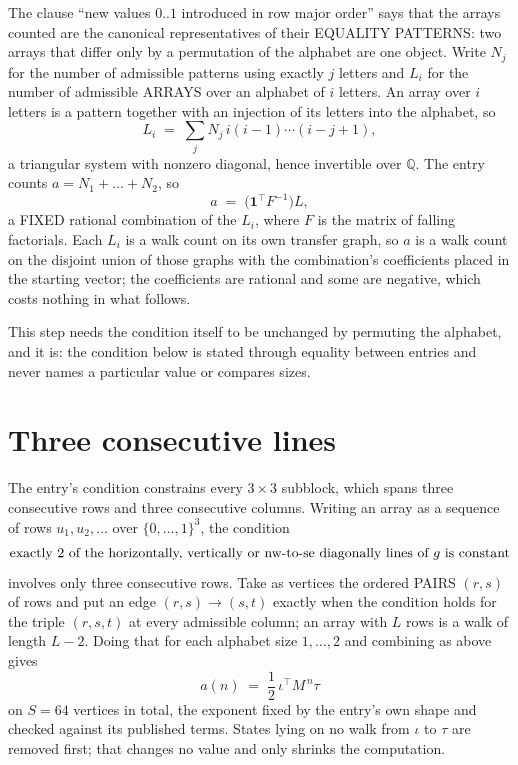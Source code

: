 \documentclass[11pt,a4paper]{article}
\theoremstyle{plain}
\theoremstyle{definition}
\begin{document}
The clause ``new values $0..1$ introduced in row major order'' says that the arrays
counted are the canonical representatives of their EQUALITY PATTERNS: two arrays that differ
only by a permutation of the alphabet are one object. Write $N_j$ for the number of admissible
patterns using exactly $j$ letters and $L_i$ for the number of admissible ARRAYS over an
alphabet of $i$ letters. An array over $i$ letters is a pattern together with an injection of
its letters into the alphabet, so
\[
L_i\;=\;\sum_{j}N_j\,i(i-1)\cdots(i-j+1),
\]
a triangular system with nonzero diagonal, hence invertible over $\mathbb{Q}$. The entry
counts $a=N_1+\dots+N_{2}$, so
\[
a\;=\;\bigl(\mathbf{1}^{\!\top}F^{-1}\bigr)L ,
\]
a FIXED rational combination of the $L_i$, where $F$ is the matrix of falling factorials.
Each $L_i$ is a walk count on its own transfer graph, so $a$ is a walk count on the disjoint
union of those graphs with the combination's coefficients placed in the starting vector; the
coefficients are rational and some are negative, which costs nothing in what follows.

This step needs the condition itself to be unchanged by permuting the alphabet, and it is:
the condition below is stated through equality between entries and never names a particular
value or compares sizes.

\section{Three consecutive lines}

The entry's condition constrains every $3\times3$ subblock, which spans three consecutive
rows and three consecutive columns. Writing an array as a sequence of rows
$u_1,u_2,\dots$ over $\{0,\dots,1\}^{3}$, the condition
\[
\text{exactly }2\text{ of the horizontally, vertically or nw-to-se diagonally lines of }g\text{ \text{is constant}}
\]
involves only three consecutive rows. Take as vertices the ordered PAIRS $(r,s)$ of
rows and put an edge $(r,s)\to(s,t)$ exactly when the condition holds for the triple
$(r,s,t)$ at every admissible column; an array with $L$ rows is a walk of length $L-2$.
Doing that for each alphabet size $1,\dots,2$ and combining as above gives
\[
a(n)\;=\;\frac{1}{2}\,\iota^{\!\top}M^{\,n}\tau
\]
on $S=64$ vertices in total, the exponent fixed by the entry's own shape and checked against
its published terms. States lying on no walk from $\iota$ to $\tau$ are removed first; that
changes no value and only shrinks the computation.
\end{document}
